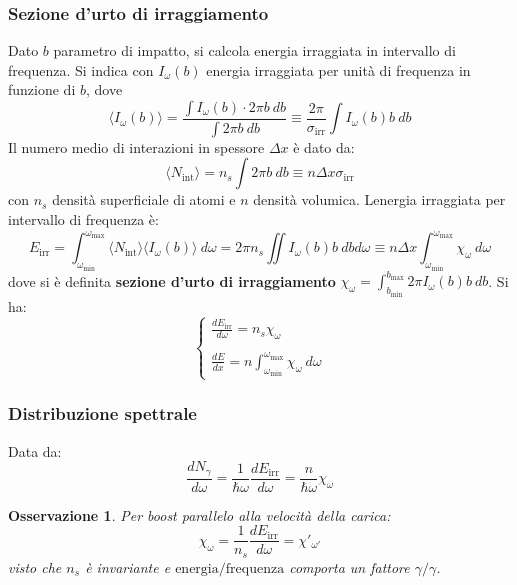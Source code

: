 \documentclass[10pt, a4paper]{scrartcl}
\numberwithin{equation}{subsection}
\theoremstyle{style1}
\newtheorem{osservazione}{Osservazione}[section]
\begin{document}
\subsubsection{Sezione d'urto di irraggiamento}
Dato $b$ parametro di impatto, si calcola energia irraggiata in intervallo di frequenza. Si indica con $I_\omega(b)$ energia irraggiata per unit\`a di frequenza in funzione di $b$, dove
\begin{equation}
	\langle I_\omega(b) \rangle = \frac{\displaystyle \int I_\omega(b) \cdot  2\pi  b\ db}{\displaystyle \int 2\pi b \ db}\equiv \frac{2\pi}{\sigma _\text{irr}} \int I_\omega(b) b \ db
\end{equation}
Il numero medio di interazioni in spessore $\Delta x$ \`e dato da:
\begin{equation}
	\langle N_\text{int} \rangle = n_s \int 2\pi b \ db \equiv n\Delta x \sigma _\text{irr}
\end{equation}
con $n_s$ densit\`a superficiale di atomi e $n$ densit\`a volumica. Lenergia irraggiata per intervallo di frequenza \`e:
\begin{equation}
	E_\text{irr} = \int_{\omega_\text{min}} ^{\omega_\text{max}} \langle N_\text{int} \rangle \langle I_\omega(b) \rangle \ d\omega = 2\pi n_s \iint I_\omega(b) b \ dbd\omega \equiv n\Delta x \int_{\omega_\text{min}} ^{\omega_\text{max}} \chi _\omega \ d\omega
\end{equation}
dove si \`e definita \textbf{sezione d'urto di irraggiamento} $\chi _\omega = \int_{b_\text{min}} ^{b_\text{max}} 2\pi I_\omega (b) b \ db$. Si ha:
\begin{equation}
	\begin{cases}
		\displaystyle \frac{d E_\text{irr}}{d \omega} = n_s \chi _\omega\\
		\\
		\displaystyle \frac{d E}{d x} = n \int_{\omega_\text{min}} ^{\omega_\text{max}} \chi _\omega \ d\omega
	\end{cases}
\end{equation}
\subsubsection{Distribuzione spettrale}
Data da: 
\begin{equation}
\frac{d N_\gamma}{d \omega} = \frac{1}{\hbar  \omega} \frac{d E_\text{irr}}{d \omega} = \frac{n}{\hbar  \omega} \chi _\omega
\end{equation}
\begin{osservazione}
Per boost parallelo alla velocit\`a della carica:
\begin{equation}
	\chi _\omega = \frac{1}{n_s} \frac{d E_\text{irr}}{d \omega}  = \chi '_{\omega'} 
\end{equation}
visto che $n_s$ \`e invariante e $\text{energia} / \text{frequenza}$ comporta un fattore $\gamma / \gamma$.
\end{osservazione}
\end{document}
